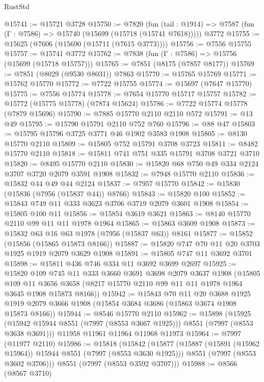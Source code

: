 \begin{lexlean}{RustStd}
\begin{coremodule}
{\begin{coremodule}
{{{{{{{{{{{{{{{{{{{{{{{{{{{{{{{{{{{{{{{{{{{@15741 := @15721 @3728
@15750 := @7820
    (fun (tail : @1914) => @7587 (fun (Γ : @7586) => @15740 (@15699 (@15718 (@15741 @7618)))))
    @3772
@15755 := @15625 (@7606 (@15690 (@15711 (@7615 @3773))))
@15756 := @7556 @15755
@15757 := @15741 @3772
@15762 := @7838 (fun (Γ : @7586) => @15756 (@15699 (@15718 @15757)))
@15765 := @7851 (@8175 (@7857 @8177))
@15769 := @7851 (@8029 (@9530 @8031)) @7863
@15770 := @15765 @15769
@15771 := @15762 @15770
@15772 := @7722 @15755
@15774 := @15697 (@7647 @15770)
@15775 := @7556 @15774
@15778 := @7654 @15770 @15717 @15757
@15782 := @15772 (@15775 @15778) (@7874 @15624)
@15786 := @7722 @15774 @15778 (@7879 @15696)
@15790 := @7885 @15770 @2110 @2110 @572
@15791 := @13 @49
@15795 := @15790 @15791 @2110 @752 @760
@15796 := @88 @47
@15803 := @15795 @15796 @3725 @3771 @46 @1902 @3583 @1908
@15805 := @8130 @15770 @2110
@15809 := @15805 @752 @15791 @3708 @3723
@15811 := @8482 @15770 @2110
@15818 := @15811 @741 @751 @335 @15791 @3708 @3721 @3710
@15820 := @8495 @15770 @2110
@15830 := @15820 @68 @750 @49 @334 @2124 @3707 @3720 @2079 @3591 @1908
@15832 := @7948 @15770 @2110
@15836 := @15832 @44 @49 @44 @2124
@15837 := @7957 @15770
@15842 := @15830 (@15836 (@7956 (@15837 @44)) @8766)
@15843 := @15820 @100
@15852 := @15843 @749 @11 @333 @3623 @3706 @3719 @2079 @3601 @1908
@15854 := @15805 @100 @11
@15856 := @15854 @3619 @3621
@15863 := @8140 @15770 @2110 @99 @11 @11 @1978 @1964
@15865 := @15863 @3609 @1908
@15873 := @15832 @63 @16 @63 @1978 (@7956 (@15837 @63)) @8161
@15877 := @15852 (@15856 (@15865 @15873 @8166))
@15887 := @15820 @747 @70 @11 @20 @3703 @1925 @1919 @2079 @3629 @1908
@15891 := @15805 @747 @11 @3692 @3701
@15898 := @15811 @436 @746 @334 @11 @3692 @3699 @2697
@15925 := @15820
    @109
    @745
    @11
    @333
    @3660
    @3691
    @3698
    @2079
    @3637
    @1908
    (@15805
      @109
      @11
      @3656
      @3658
      (@8217 @15770 @2110 @99 @11 @11 @1978 @1964 @3645 @1908 @15873 @8166))
@15942 := @15843
    @70
    @11
    @20
    @3688
    @1925
    @1919
    @2079
    @3666
    @1908
    (@15854 @3684 @3686 (@15863 @3674 @1908 @15873 @8166))
@15944 := @8546 @15770 @2110
@15962 := @15898
    (@15925 (@15942 @15944 @8551 (@7997 (@8553 @3667 @1925))) @8551 (@7997 (@8553 @3638 @3691)))
    @11958
    @11961
    @11964
    @11968
    @11973
@15964 := @7997 (@11977 @2110)
@15986 := @15818
    (@15842
      (@15877
        (@15887 (@15891 (@15962 @15964)) @15944 @8551 (@7997 (@8553 @3630 @1925)))
        @8551
        (@7997 (@8553 @3602 @3706)))
      @8551
      (@7997 (@8553 @3592 @3707)))
@15988 := @8566 (@8567 @3710)
}}}}}}}}}}}}}}}}}}}}}}}}}}}}}}}}}}}}}}}}}}}
\end{coremodule}}
\end{coremodule}
\end{lexlean}
